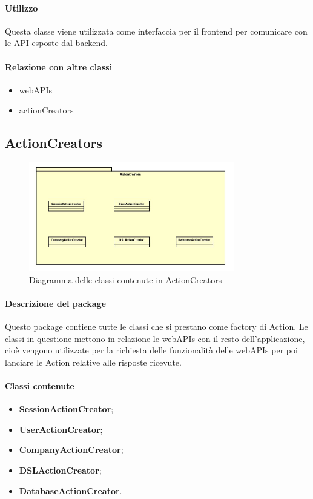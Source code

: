 \paragraph*{Utilizzo}
Questa classe viene utilizzata come interfaccia per il frontend per comunicare con le API esposte dal backend.
\paragraph*{Relazione con altre classi}
\begin{itemize}
\item webAPIs
\item actionCreators
\end{itemize} 

\subsection{ActionCreators}

\begin{figure}[h]
\centering
\includegraphics[width=0.8\textwidth]{res/sections/imgs/actioncreator-diagram.jpg}
\caption{Diagramma delle classi contenute in ActionCreators}
\end{figure}

\paragraph*{Descrizione del package}
Questo package contiene tutte le classi che si prestano come factory di Action. Le classi in questione mettono in relazione le webAPIs con il resto dell'applicazione, cioè vengono utilizzate per la richiesta delle funzionalità delle webAPIs per poi lanciare le Action relative alle risposte ricevute.

\paragraph*{Classi contenute}
\begin{itemize}
\item \textbf{SessionActionCreator};
\item \textbf{UserActionCreator};
\item \textbf{CompanyActionCreator};
\item \textbf{DSLActionCreator};
\item \textbf{DatabaseActionCreator}.
\end{itemize}

